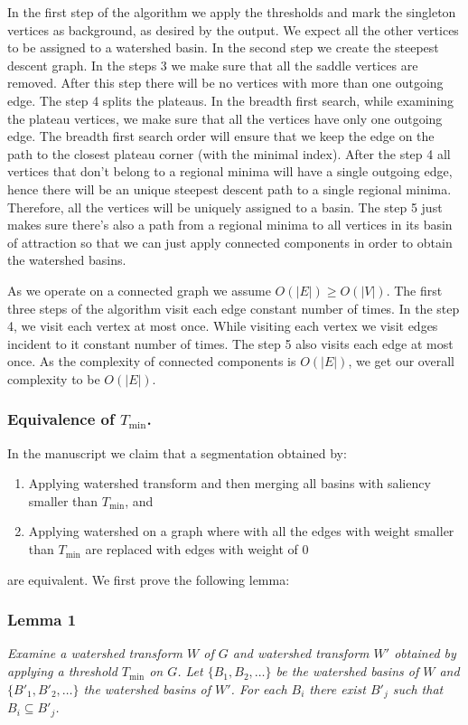 \documentclass{llncs}
\begin{document}
In the first step of the algorithm we apply the thresholds and mark the singleton vertices as background, as desired by the output. We expect all the other vertices to be assigned to a watershed basin. In the second step we create the steepest descent graph. In the steps 3 we make sure that all the saddle vertices are removed. After this step there will be no vertices with more than one outgoing edge. The step 4 splits the plateaus. In the breadth first search, while examining the plateau vertices, we make sure that all the vertices have only one outgoing edge. The breadth first search order will ensure that we keep the edge on the path to the closest plateau corner (with the minimal index). After the step 4 all vertices that don't belong to a regional minima will have a single outgoing edge, hence there will be an unique steepest descent path to a single regional minima. Therefore, all the vertices will be uniquely assigned to a basin. The step 5 just makes sure there's also a path from a regional minima to all vertices in its basin of attraction so that we can just apply connected components in order to obtain the watershed basins.

As we operate on a connected graph we assume $O(|E|) \ge O(|V|)$. The first three steps of the algorithm visit each edge constant number of times. In the step 4, we visit each vertex at most once. While visiting each vertex we visit edges incident to it constant number of times. The step 5 also visits each edge at most once. As the complexity of connected components is $O(|E|)$, we get our overall complexity to be $O(|E|)$.

\subsubsection{Equivalence of $T_{\min}$.} In the manuscript we claim that a segmentation obtained by:
\begin{enumerate}
\item Applying watershed transform and then merging all basins with saliency smaller than $T_{\min}$, and
\item Applying watershed on a graph where with all the edges with weight smaller than $T_{\min}$ are replaced with edges with weight of $0$
\end{enumerate}
are equivalent. We first prove the following lemma:

\subsubsection{Lemma 1} \emph{Examine a watershed transform $W$ of $G$ and watershed transform $W'$ obtained by applying a threshold $T_{\min}$ on $G$. Let $\{B_1,B_2,\dots\}$ be the watershed basins of $W$ and $\{B'_1,B'_2,\dots\}$ the watershed basins of $W'$. For each $B_i$ there exist $B'_j$ such that $B_i \subseteq B'_j$.}
\end{document}

